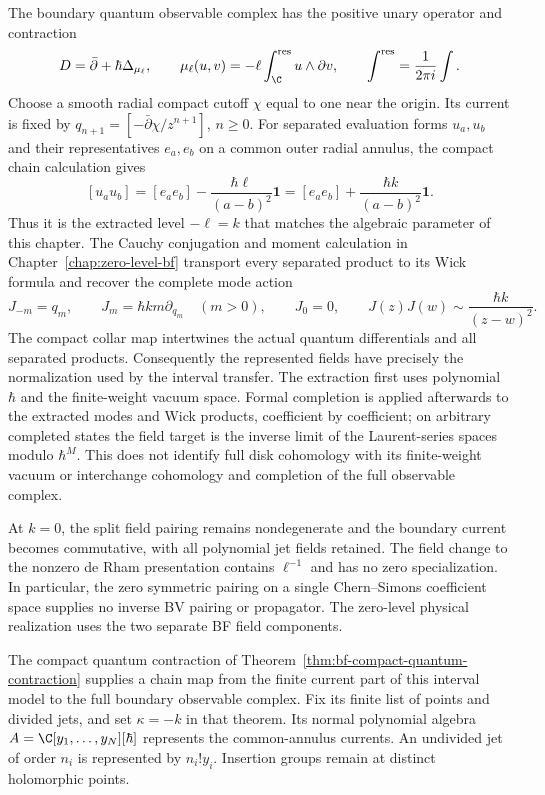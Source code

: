 The boundary quantum observable complex has the positive unary
operator and contraction
\[
 D=\bar\partial+\hbar\Delta_{\mu_\ell},\qquad
 \mu_\ell(u,v)=-\ell\int_\C^{\mathrm{res}}u\wedge\partial v,
 \qquad \int^{\mathrm{res}}=\frac1{2\pi i}\int.
\]
Choose a smooth radial compact cutoff $\chi$ equal to one near the
origin.  Its current is fixed by
$q_{n+1}=[-\bar\partial\chi/z^{n+1}]$, $n\ge0$.
For separated evaluation forms $u_a,u_b$ and their representatives
$e_a,e_b$ on a common outer radial annulus, the compact chain
calculation gives
\[
 [u_au_b]=[e_ae_b]-\frac{\hbar\ell}{(a-b)^2}\mathbf1
                  =[e_ae_b]+\frac{\hbar k}{(a-b)^2}\mathbf1.
\]
Thus it is the extracted level $-\ell=k$ that matches the algebraic
parameter of this chapter.  The Cauchy conjugation and moment
calculation in Chapter~\ref{chap:zero-level-bf} transport every
separated product to its Wick formula and recover the complete mode action
\[
 J_{-m}=q_m,\qquad J_m=\hbar k m\partial_{q_m}\quad(m>0),\qquad J_0=0,
 \qquad J(z)J(w)\sim\frac{\hbar k}{(z-w)^2}.
\]
The compact collar map intertwines the actual quantum differentials
and all separated products.  Consequently the represented fields
have precisely the normalization used by the interval transfer.
The extraction first uses polynomial $\hbar$ and the finite-weight
vacuum space.  Formal completion is applied afterwards to the
extracted modes and Wick products, coefficient by coefficient; on
arbitrary completed states the field target is the inverse limit
of the Laurent-series spaces modulo $\hbar^M$.  This does not identify
full disk cohomology with its finite-weight vacuum or interchange
cohomology and completion of the full observable complex.

At $k=0$, the split field pairing remains nondegenerate and the
boundary current becomes commutative, with all polynomial jet fields
retained.  The field change to the nonzero de Rham presentation
contains $\ell^{-1}$ and has no zero specialization.  In particular,
the zero symmetric pairing on a single Chern--Simons coefficient
space supplies no inverse BV pairing or propagator.  The zero-level
physical realization uses the two separate BF field components.

The compact quantum contraction of
Theorem~\ref{thm:bf-compact-quantum-contraction} supplies a chain map
from the finite current part of this interval model to the full
boundary observable complex.  Fix its finite list of points and divided
jets, and set $\kappa=-k$ in that theorem.  Its normal polynomial algebra
$A=\C[y_1,\ldots,y_N][\hbar]$ represents the common-annulus currents.
An undivided jet of order $n_i$ is represented by $n_i!y_i$.
Insertion groups remain at distinct holomorphic points.

